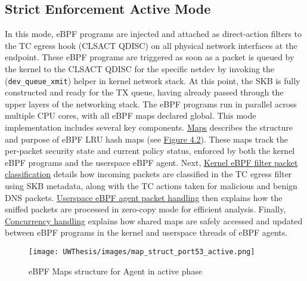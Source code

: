 \documentclass [11pt, proquest] {uwthesis}[2020/02/24]
\begin{document}
\subsection{Strict Enforcement Active Mode}
\label{sec:active}
In this mode, eBPF programs are injected and attached as direct-action filters to the TC egress hook (CLSACT QDISC) on all physical network interfaces at the endpoint. 
These eBPF programs are triggered as soon as a packet is queued by the kernel to the CLSACT QDISC for the specific netdev by invoking the (\texttt{dev\_queue\_xmit}) helper in kernel network stack. At this point, the SKB is fully constructed and ready for the TX queue, having already passed through the upper layers of the networking stack. The eBPF programs run in parallel across multiple CPU cores, with all eBPF maps declared global.
This mode implementation includes several key components. \hyperref[sec:dp_eBPF_LRU_Maps_active]{Maps} describes the structure and purpose of eBPF LRU hash maps (see \hyperref[sec:dp_eBPF_LRU_Maps_active]{Figure 4.2}). These maps track the per-packet security state and current policy status, enforced by both the kernel eBPF programs and the userspace eBPF agent. Next, \hyperref[active:sec1]{Kernel eBPF filter packet classification} details how incoming packets are classified in the TC egress filter using SKB metadata, along with the TC actions taken for malicious and benign DNS packets. \hyperref[active:sec3]{Userspace eBPF agent packet handling} then explains how the sniffed packets are processed in zero-copy mode for efficient analysis. Finally, \hyperref[active:sec3]{Concurrency handling} explains how shared maps are safely accessed and updated between eBPF programs in the kernel and userspace threads of eBPF agents.


\begin{figure}[htbp]
\centering
\texttt{[image: UWThesis/images/map\_struct\_port53\_active.png]}
\caption{eBPF Maps structure for Agent in active phase}
\label{sec:dp_eBPF_LRU_Maps_active}
\end{figure}

\end{document}
